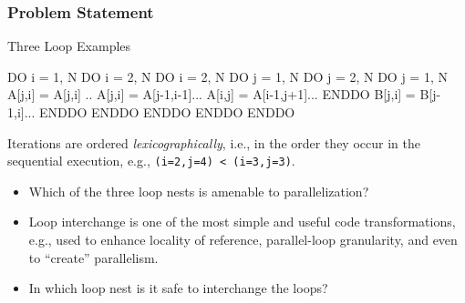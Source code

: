 \documentclass{beamer}
\newcommand{\emp}[1]{\textcolor{DikuRed}{ #1}}
\begin{document}
\begin{frame}[fragile,t]
  \frametitle{Problem Statement} %

\begin{block}{Three Loop Examples}
\begin{colorcode}
DO i = 1, N             DO i = 2, N                 DO i = 2, N
  DO j = 1, N             DO j = 2, N                 DO j = 1, N 
    A[j,i] = A[j,i] ..      A[j,i] = A[j-1,i-1]...        A[i,j] = A[i-1,j+1]...
  ENDDO                     B[j,i] = B[j-1,i]...      ENDDO
ENDDO                   ENDDO ENDDO                 ENDDO
\end{colorcode}
\end{block} 

Iterations are ordered {\em lexicographically}, i.e., in the order
they occur in the sequential execution, e.g., {\tt(i=2,j=4) < (i=3,j=3)}.

\bigskip

\begin{itemize}
    \item \emp{Which of the three loop nests is amenable to parallelization?}\smallskip
    \item Loop interchange is one of the most simple and useful code transformations,
            e.g., used to enhance locality of reference, parallel-loop granularity,
            and even to ``create'' parallelism.\smallskip
    \item \emp{In which loop nest is it safe to interchange the loops?}
\end{itemize}


\end{frame}
\end{document}
